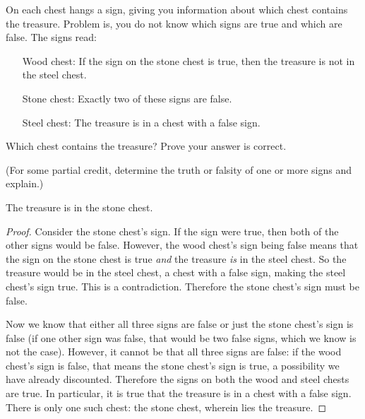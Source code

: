 \documentclass[11pt]{exam}
\begin{document}
\begin{questions}
On each chest hangs a sign, giving you information about which chest contains the treasure.  Problem is, you do not know which signs are true and which are false.  The signs read:
\begin{itemize}
  \item[Wood chest:] If the sign on the stone chest is true, then the treasure is not in the steel chest.
  \item[Stone chest:] Exactly two of these signs are false. %
  \item[Steel chest:] The treasure is in a chest with a false sign.
\end{itemize}
Which chest contains the treasure?  Prove your answer is correct.

(For some partial credit, determine the truth or falsity of one or more signs and explain.)

\begin{solution}
 The treasure is in the stone chest.

 \begin{proof}
  Consider the stone chest's sign.  If the sign were true, then both of the other signs would be false.  However, the wood chest's sign being false means that the sign on the stone chest is true {\em and} the treasure {\em is} in the steel chest.  So the treasure would be in the steel chest, a chest with a false sign, making the steel chest's sign true.  This is a contradiction.  Therefore the stone chest's sign must be false.

  Now we know that either all three signs are false or just the stone chest's sign is false (if one other sign was false, that would be two false signs, which we know is not the case).  However, it cannot be that all three signs are false: if the wood chest's sign is false, that means the stone chest's sign is true, a possibility we have already discounted.  Therefore the signs on both the wood and steel chests are true.  In particular, it is true that the treasure is in a chest with a false sign.  There is only one such chest: the stone chest, wherein lies the treasure.
 \end{proof}

\end{solution}




\end{questions}
\end{document}
